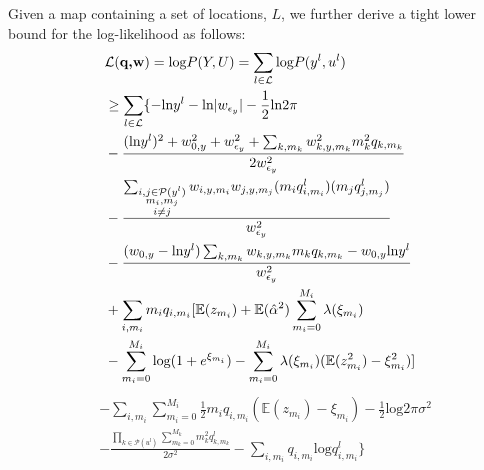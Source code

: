 \documentclass[review]{elsarticle}
\begin{document}
Given a map containing a set of locations, $L$, we further derive a tight lower bound for the log-likelihood as follows:
\begin{equation*}
\begin{aligned}
    & \mathcal{L}(\textbf{q,w})  = \text{log}P(Y,U) = \sum_{l \in \mathcal{L}}\text{log}P(y^{l},u^{l}) \\
    & \geq \sum_{l \in \mathcal{L}} \{-\text{ln}y^{l} - \text{ln}|w_{\epsilon_{y}}| - \frac{1}{2}\text{ln}2\pi \\
    & - \frac{(\text{ln}y^{l})^2 + w_{0,y}^2 + w_{\epsilon_{y}}^2 + \sum_{k, m_{k}}w_{k,y,m_{k}}^2 m_{k}^2 q_{k,m_{k}}}{2w_{\epsilon_{y}}^2}\\
    & - \frac{\sum_{\begin{subarray}{c} i,j \in \mathcal{P}(y^l)\\ m_{i}, m_{j}\\ i \neq j\end{subarray}}w_{i,y,m_{i}}w_{j,y,m_{j}}(m_{i}q^l_{i,m_{i}})(m_{j} q^l_{j,m_{j}})}{w_{\epsilon_{y}}^2} \\ 
    & - \frac{(w_{0,y}-\text{ln}y^l)\sum_{k, m_{k}}w_{k,y,m_{k}} m_{k}q_{k, m_{k}}- w_{0,y}\text{ln}y^l}{w_{\epsilon_{y}}^2} \\
    & + \sum_{i, m_{i}}m_{i}q_{i, m_{i}}[ \mathbb{E}(z_{m_{i}}) + \mathbb{E}(\hat{\alpha}^{2})\sum_{m_{i} = 0}^{M_{i}}\lambda(\xi_{m_{i}})\\
    & -\sum_{m_{i} = 0}^{M_{i}}\text{log}(1+e^{\xi_{m_{i}}}) - \sum_{m_{i} = 0}^{M_{i}}\lambda(\xi_{m_{i}})(\mathbb{E}(z_{m_{i}}^{2})-\xi_{m_{i}}^{2})]
\end{aligned}
\end{equation*}
\begin{equation*}
\begin{aligned}
    & -\sum_{i, m_{i}}\sum_{m_{i} = 0}^{M_{i}}\frac{1}{2}m_{i}q_{i, m_{i}}(\mathbb{E}(z_{m_{i}}) - \xi_{m_{i}}) -\frac{1}{2}\text{log}2\pi \sigma^2 \\
    & - \frac{\prod_{k\in \mathcal{P}(u^l)}\sum_{m_{k} = 0}^{M_{k}}m_{k}^2 q^l_{k,m_{k}}}{2\sigma^2}  - \sum_{i,m_{i}}q_{i,m_i}\text{log}q^l_{i,m_i}\}
\end{aligned}
\end{equation*}
\end{document}

